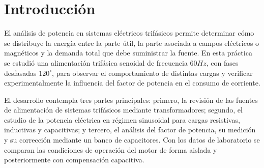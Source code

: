 \section{Introducción}

	El análisis de potencia en sistemas eléctricos trifásicos permite determinar cómo se distribuye la energía entre la parte útil, la parte asociada a campos eléctricos o magnéticos y la demanda total que debe suministrar la fuente. En esta práctica se estudió una alimentación trifásica senoidal de frecuencia \(60\unit{Hz}\), con fases desfasadas \(120^{\circ}\), para observar el comportamiento de distintas cargas y verificar experimentalmente la influencia del factor de potencia en el consumo de corriente.
	
	El desarrollo contempla tres partes principales: primero, la revisión de las fuentes de alimentación de sistemas trifásicos mediante transformadores; segundo, el estudio de la potencia eléctrica en régimen sinusoidal para cargas resistivas, inductivas y capacitivas; y tercero, el análisis del factor de potencia, su medición y su corrección mediante un banco de capacitores. Con los datos de laboratorio se comparan las condiciones de operación del motor de forma aislada y posteriormente con compensación capacitiva.